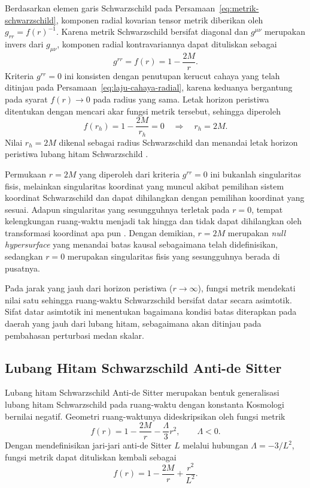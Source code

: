 Berdasarkan elemen garis Schwarzschild pada Persamaan~\eqref{eq:metrik-schwarzschild}, komponen radial kovarian tensor metrik diberikan oleh $g_{rr}=f(r)^{-1}$. Karena metrik Schwarzschild bersifat diagonal dan $g^{\mu\nu}$ merupakan invers dari $g_{\mu\nu}$, komponen radial kontravariannya dapat dituliskan sebagai
\begin{equation}
g^{rr}=f(r)=1-\frac{2M}{r}.
\label{eq:grr-invers-schwarzschild}
\end{equation}
Kriteria $g^{rr}=0$ ini konsisten dengan penutupan kerucut cahaya yang telah ditinjau pada Persamaan~\eqref{eq:laju-cahaya-radial}, karena keduanya bergantung pada syarat $f(r) \to 0$ pada radius yang sama. Letak horizon peristiwa ditentukan dengan mencari akar fungsi metrik tersebut, sehingga diperoleh
\begin{equation}
f(r_h)=1-\frac{2M}{r_h}=0 \quad \Rightarrow \quad r_h=2M.
\label{eq:horizon-schwarzschild}
\end{equation}
Nilai $r_h=2M$ dikenal sebagai radius Schwarzschild dan menandai letak horizon peristiwa lubang hitam Schwarzschild \parencite{Carroll2004}.

Permukaan $r = 2M$ yang diperoleh dari kriteria $g^{rr} = 0$ ini bukanlah singularitas 
fisis, melainkan singularitas koordinat yang muncul akibat pemilihan sistem koordinat 
Schwarzschild dan dapat dihilangkan dengan pemilihan koordinat yang sesuai. Adapun 
singularitas yang sesungguhnya terletak pada $r = 0$, tempat kelengkungan ruang-waktu 
menjadi tak hingga dan tidak dapat dihilangkan oleh transformasi koordinat apa pun 
\parencite{Frolov1998}. Dengan demikian, $r = 2M$ merupakan \textit{null hypersurface} 
yang menandai batas kausal sebagaimana telah didefinisikan, sedangkan $r = 0$ merupakan 
singularitas fisis yang sesungguhnya berada di pusatnya.

Pada jarak yang jauh dari horizon peristiwa ($r \to \infty$), fungsi metrik mendekati 
nilai satu sehingga ruang-waktu Schwarzschild bersifat datar secara asimtotik. Sifat 
datar asimtotik ini menentukan bagaimana kondisi batas diterapkan pada daerah yang jauh 
dari lubang hitam, sebagaimana akan ditinjau pada pembahasan perturbasi medan skalar.

\subsection{Lubang Hitam Schwarzschild Anti-de Sitter}
\label{subsec:lh-sads}

\noindent Lubang hitam Schwarzschild Anti-de Sitter merupakan bentuk generalisasi lubang hitam
Schwarzschild pada ruang-waktu dengan konstanta Kosmologi bernilai negatif. Geometri
ruang-waktunya dideskripsikan oleh fungsi metrik
\begin{equation}
    f(r) = 1 - \frac{2M}{r} - \frac{\Lambda}{3} r^2, \qquad \Lambda < 0.
    \label{eq:f-sads}
\end{equation}
Dengan mendefinisikan jari-jari anti-de Sitter $L$ melalui hubungan $\Lambda = -3/L^2$,
fungsi metrik dapat dituliskan kembali sebagai
\begin{equation}
    f(r) = 1 - \frac{2M}{r} + \frac{r^2}{L^2}.
    \label{eq:f-sads-L}
\end{equation}

